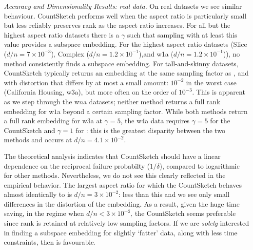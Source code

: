 \noindent
\textit{Accuracy and Dimensionality Results: real data.}
On real datasets we see similar behaviour.
CountSketch performs well when the aspect ratio is particularly small
but less reliably preserves rank as the aspect ratio increases.
For all but the highest aspect ratio datasets
there is a $\gamma$ such that sampling with at least this value
provides a subspace embedding.
For the highest aspect ratio datasets (Slice ($d/n = 7 \times 10^{-3}$),
 Complex ($d/n=1.2 \times 10^{-1}$),and w1a ($d/n = 1.2 \times
 10^{-1}$)), no method consistently finds a subspace embedding.
For tall-and-skinny datasets, CountSketch typically returns an
embedding at the same sampling factor as \SRHT,
and with distortion that differs by at most a small amount:  $10^{-2}$
in the worst case (California Housing, w3a), but more often on the order of $10^{-3}$.
This is apparent as we step through the w$n$a datasets;
neither method returns a full rank embedding for w$1$a beyond
 a certain sampling factor.
While both methods return a full rank embedding for w$3$a at $\gamma=5$,
 the w$4$a data requires $\gamma = 5$ for the CountSketch and $\gamma = 1$
 for \SRHT: this is the greatest disparity between the two methods and occurs
 at $d/n = 4.1 \times 10^{-2}$.


The theoretical analysis indicates that CountSketch should have a
linear dependence on the reciprocal failure probabilty ($1/\delta$),
compared to logarithmic for other methods.
Nevertheless, we do not see this clearly reflected in the empirical
behavior.
The largest aspect ratio for which the CountSketch behaves almost identically
 to \SRHT is $d/n = 3 \times 10^{-2}$: less than this and we see only small
 differences in the distortion of the embedding.
As a result, given the huge time saving, in the regime when
$d/n < 3 \times 10^{-2}$, the CountSketch seems preferable
since rank is retained at relatively low sampling factors.
If we are \textit{solely} interested in finding a subspace embedding for
slightly `fatter' data, along with less time constraints, then \SRHT is
 favourable.


